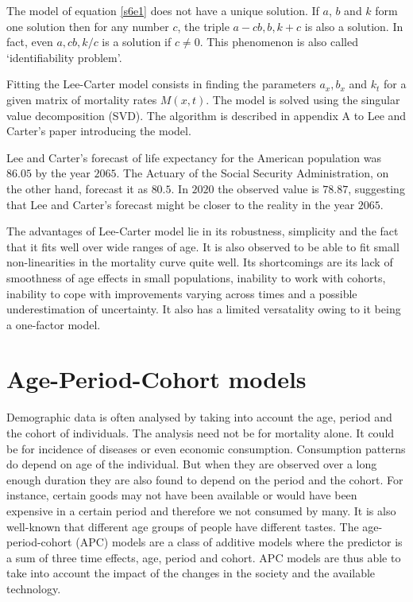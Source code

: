 \documentclass{article}
\numberwithin{equation}{section}
\begin{document}
The model of equation \eqref{s6e1} does not have a unique solution. If 
${a}$, ${b}$ and ${k}$ form one solution then for any number $c$,
the triple ${a} - c{b}, {b}, {k} + c$ is also a solution. In
fact, even ${a}, c{b}, {k}/c$ is a solution if $c \ne 0$. This phenomenon is
also called `identifiability problem'\cite{plat2009stochastic}.

Fitting the Lee-Carter model consists in finding the parameters ${a}_x,
{b}_x$ and ${k}_t$ for a given matrix of mortality rates ${M}(x, t)$.
The model is solved using the singular value decomposition (SVD). The algorithm
is described in appendix A to Lee and Carter's paper\cite{lee1992modeling} 
introducing the model.

Lee and Carter's forecast of life expectancy for the American population was 
$86.05$ by the year $2065$. The Actuary of the Social Security Administration,
on the other hand, forecast it as $80.5$. In $2020$ the observed value is 
$78.87$, suggesting that Lee and Carter's forecast might be closer to the 
reality in the year $2065$.

The advantages of Lee-Carter model lie in its robustness, simplicity and 
the fact that it fits well over wide ranges of age. It is also observed to be
able to fit small non-linearities in the mortality curve quite well. Its 
shortcomings are its lack of smoothness of age effects in small populations, 
inability to work with cohorts, inability to cope with improvements varying 
across times and a possible underestimation of uncertainty. It also has a 
limited versatality owing to it being a one-factor model.

\section{Age-Period-Cohort models}\label{s7}
Demographic data is often analysed by taking into account the age, period 
and the cohort of individuals. The analysis need not be for mortality alone.
It could be for incidence of diseases or even economic consumption. Consumption
patterns do depend on age of the individual. But when they are observed over
a long enough duration they are also found to depend on the period and the 
cohort. For instance, certain goods may not have been available or would have
been expensive in a certain period and therefore we not consumed by many. It
is also well-known that different age groups of people have different tastes.
The age-period-cohort (APC) models are a class of additive models where the
predictor is a sum of three time effects, age, period and cohort. APC models
are thus able to take into account the impact of the changes in the society 
and the available technology.
\end{document}
